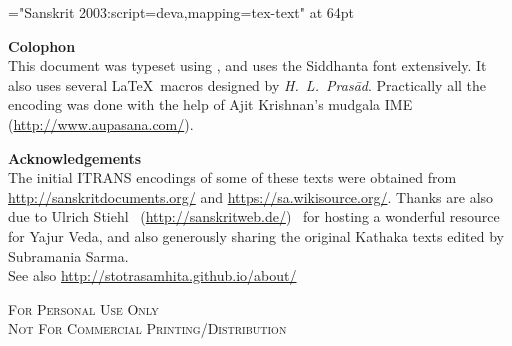 \thispagestyle{empty}\clearpage
\begin{titlepage}
\vspace*{4.5cm}
\begin{center}
{\font\x="Sanskrit 2003:script=deva,mapping=tex-text" at 64pt \x \titletext}
\end{center}
\end{titlepage}

\begin{center}
\small
\parbox{0.85\linewidth}{
{\Large \textbf{Colophon}}\\
\noindent This document was typeset using \XeLaTeX, and uses the Siddhanta font extensively. It also uses several \LaTeX\ macros designed by \textit{H.~L.~Prasād}. Practically all the encoding was done with the help of Ajit Krishnan's mudgala IME (\url{http://www.aupasana.com/}).
\vspace*{2cm}

{\large \textbf{Acknowledgements}}\\
The initial ITRANS encodings of some of these texts were obtained from \url{http://sanskritdocuments.org/} and \url{https://sa.wikisource.org/}. Thanks are also due to Ulrich Stiehl~ (\url{http://sanskritweb.de/}) ~for hosting a wonderful resource for Yajur Veda, and also generously sharing the original Kathaka texts edited by Subramania Sarma. \\
See also \url{http://stotrasamhita.github.io/about/}
\vspace*{1cm}
%
\begin{center}
{\scshape{For Personal Use Only\\
 Not For Commercial Printing/Distribution}}
\end{center}
}
\end{center}
\clearemptydoublepage %
\setcounter{page}{0} %
\renewcommand{\chaptermark}[1]{%
\markboth{#1}{}} %
\tableofcontents

\mbox{}
\clearpage
\thispagestyle{empty}
\clearemptydoublepage

